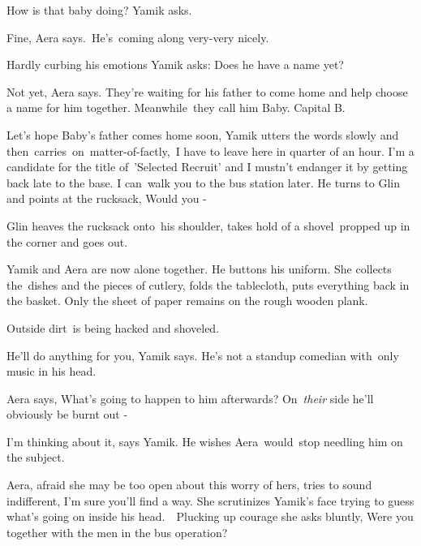 \documentclass[letterpaper]{article}
\begin{document}
{\textquotedbl}How is that baby doing?{\textquotedbl} Yamik asks. 

{\textquotedbl}Fine,{\textquotedbl} Aera says.\  {\textquotedbl}He's\ coming along very{}-very nicely.{\textquotedbl} 

Hardly curbing his emotions Yamik asks: {\textquotedbl}Does he have a name yet?{\textquotedbl} 

{\textquotedbl}Not yet,{\textquotedbl} Aera says. {\textquotedbl}They're waiting for his father to come home and help
choose a name for him together. Meanwhile\textcolor[rgb]{0.0,0.4392157,0.7529412}{\ }they call him Baby. Capital
B.{\textquotedbl}

{\textquotedbl}Let's hope Baby's father comes home soon,{\textquotedbl} Yamik utters the words slowly and
then\ carries\ on\ matter-of{}-factly,\ {\textquotedbl}I have to leave here in quarter of an hour. I'm a candidate for
the title of\ {}'Selected Recruit{}' and I mustn't endanger it by getting back late to the base. I can~walk you to the
bus station later.{\textquotedbl} He turns to Glin and points at the rucksack, {\textquotedbl}Would you
-{\textquotedbl}\ 

Glin heaves the rucksack onto~his shoulder, takes hold of a shovel\textcolor[rgb]{0.0,0.4392157,0.7529412}{\ }propped up
in the corner and goes out.

Yamik and Aera are now alone together. He buttons his uniform. She collects the~dishes and the pieces of cutlery, folds
the tablecloth, puts everything back in the basket. Only the sheet of paper remains on the rough wooden plank. 

Outside dirt\textcolor{red}{\ }is being hacked and shoveled. 

{\textquotedbl}He'll do anything for you,{\textquotedbl} Yamik says. {\textquotedbl}He's not a standup comedian
with\textcolor[rgb]{0.0,0.4392157,0.7529412}{\ }only music in his head.{\textquotedbl} 

Aera says, {\textquotedbl}What's going to happen to him afterwards? On\ \textit{their} side he'll obviously be burnt out
-{\textquotedbl} 

{\textquotedbl}I'm thinking about it,{\textquotedbl} says Yamik. He wishes
Aera~would\textcolor[rgb]{0.0,0.4392157,0.7529412}{\ }stop needling him on the subject.

Aera, afraid she may be too open about this worry of hers, tries to sound indifferent, {\textquotedbl}I'm sure you'll
find a way.{\textquotedbl} She scrutinizes Yamik's face trying to guess what's going on inside his head.\ \ Plucking up
courage she asks bluntly, {\textquotedbl}Were you together with the men in the bus operation?{\textquotedbl} 
\end{document}
